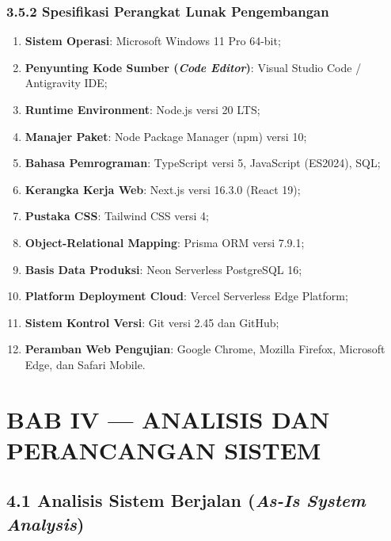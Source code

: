 \documentclass[
  indonesian,
  12pt,
]{report}
\providecommand{\tightlist}{%
  \setlength{\itemsep}{0pt}\setlength{\parskip}{0pt}}
\begin{document}
\subsection{3.5.2 Spesifikasi Perangkat Lunak
Pengembangan}\label{spesifikasi-perangkat-lunak-pengembangan}

\begin{enumerate}
\def\labelenumi{\arabic{enumi}.}
\tightlist
\item
  \textbf{Sistem Operasi}: Microsoft Windows 11 Pro 64-bit;
\item
  \textbf{Penyunting Kode Sumber (\emph{Code Editor})}: Visual Studio
  Code / Antigravity IDE;
\item
  \textbf{Runtime Environment}: Node.js versi 20 LTS;
\item
  \textbf{Manajer Paket}: Node Package Manager (npm) versi 10;
\item
  \textbf{Bahasa Pemrograman}: TypeScript versi 5, JavaScript (ES2024),
  SQL;
\item
  \textbf{Kerangka Kerja Web}: Next.js versi 16.3.0 (React 19);
\item
  \textbf{Pustaka CSS}: Tailwind CSS versi 4;
\item
  \textbf{Object-Relational Mapping}: Prisma ORM versi 7.9.1;
\item
  \textbf{Basis Data Produksi}: Neon Serverless PostgreSQL 16;
\item
  \textbf{Platform Deployment Cloud}: Vercel Serverless Edge Platform;
\item
  \textbf{Sistem Kontrol Versi}: Git versi 2.45 dan GitHub;
\item
  \textbf{Peramban Web Pengujian}: Google Chrome, Mozilla Firefox,
  Microsoft Edge, dan Safari Mobile.
\end{enumerate}

\newpage

\chapter{BAB IV --- ANALISIS DAN PERANCANGAN
SISTEM}\label{bab-iv-analisis-dan-perancangan-sistem}

\section{\texorpdfstring{4.1 Analisis Sistem Berjalan (\emph{As-Is
System
Analysis})}{4.1 Analisis Sistem Berjalan (As-Is System Analysis)}}\label{analisis-sistem-berjalan-as-is-system-analysis}
\end{document}
